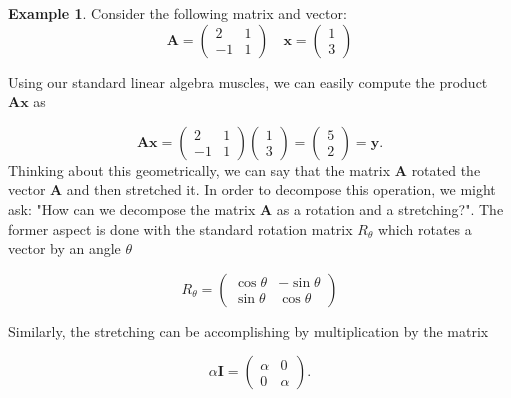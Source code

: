 \documentclass[12pt]{article}
\renewcommand{\vec}[1]{\mathbf{#1}}
\theoremstyle{definition}
\newtheorem{exmp}[thm]{Example}
\theoremstyle{remark}
\numberwithin{equation}{section}
\begin{document}
\begin{exmp}
Consider the following matrix and vector:
  \begin{equation}  
  \vec{A} = \begin{pmatrix}
    2 & 1\\
    -1 & 1
    \end{pmatrix} \quad \vec{x} = \begin{pmatrix}
    1 \\
    3
  \end{pmatrix}
  \end{equation}

  Using our standard linear algebra muscles, we can easily compute the product $\vec{Ax}$ as 

  \begin{equation}  
  \vec{Ax} = \begin{pmatrix}
    2 & 1\\
    -1 & 1
    \end{pmatrix}\begin{pmatrix}
    1 \\
    3
  \end{pmatrix} = \begin{pmatrix}
    5 \\
    2
  \end{pmatrix} = \vec{y}.
  \end{equation}
  Thinking about this geometrically, we can say that the matrix $\vec{A}$ rotated the vector $\vec{A}$ and then stretched it. In order to decompose this operation, we might ask: "How can we decompose the matrix $\vec{A}$ as a rotation and a stretching?". The former aspect is done with the standard rotation matrix $R_\theta$ which rotates a vector by an angle $\theta$

\begin{equation}
  R_\theta = \begin{pmatrix}
    \cos \theta & -\sin\theta\\
    \sin \theta & \cos\theta 
  \end{pmatrix}
\end{equation}

Similarly, the stretching can be accomplishing by multiplication by the matrix

\begin{equation}
\alpha\vec{I} = \begin{pmatrix}
  \alpha & 0 \\
         0 & \alpha
\end{pmatrix}.
\end{equation}
\end{exmp}
\end{document}
